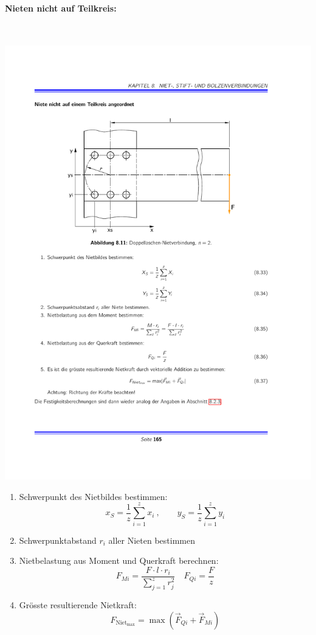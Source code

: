 		\paragraph{Nieten nicht auf Teilkreis:} %
			~
			\begin{center}
				\includegraphics[width=\columnwidth]{graphics/nietennichtteilkreis}
			\end{center}
			\begin{enumerate}
				\item Schwerpunkt des Nietbildes bestimmen:
					\begin{equation*}
						x_S = \frac{1}{z} \sum_{i=1}^z x_i\ , \qquad y_S = \frac{1}{z} \sum_{i=1}^z y_i
					\end{equation*}
				\item Schwerpunktabstand $r_i$ aller Nieten bestimmen
				\item Nietbelastung aus Moment und Querkraft berechnen:
					\begin{equation*}
						F_{Mi} = \frac{F\cdot l \cdot r_i}{\sum_{j=1}^z r_j^2} \quad F_{Qi}=\frac{F}{z}
					\end{equation*}
				\item Grösste resultierende Nietkraft:
					\begin{equation*}
						F_{\text{Niet}_{\text{max}}} = \max (\vec F_{Qi}+\vec F_{Mi})
					\end{equation*}
			\end{enumerate}
